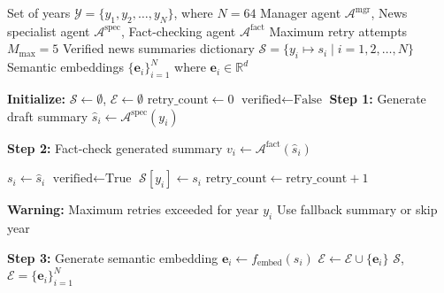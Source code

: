 \documentclass[12pt]{elsarticle}
\begin{document}
\begin{algorithm}[H]
\caption{Agentic generative AI news extraction framework}
\label{alg:agentic_news_extraction}
\begin{algorithmic}
\REQUIRE Set of years $\mathcal{Y} = \{y_1, y_2, \ldots, y_N\}$, where $N = 64$
\REQUIRE Manager agent $\mathcal{A}^{\text{mgr}}$, News specialist agent $\mathcal{A}^{\text{spec}}$, Fact-checking agent $\mathcal{A}^{\text{fact}}$
\REQUIRE Maximum retry attempts $M_{\text{max}} = 5$
\ENSURE Verified news summaries dictionary $\mathcal{S} = \{y_i \mapsto s_i \mid i = 1, 2, \ldots, N\}$
\ENSURE Semantic embeddings $\{\mathbf{e}_i\}_{i=1}^N$ where $\mathbf{e}_i \in \mathbb{R}^d$

\STATE \textbf{Initialize:} $\mathcal{S} \leftarrow \emptyset$, $\mathcal{E} \leftarrow \emptyset$
    \STATE $\text{retry\_count} \leftarrow 0$
    \STATE $\text{verified} \leftarrow \text{False}$
        \STATE \textbf{Step 1:} Generate draft summary
        \STATE $\hat{s}_i \leftarrow \mathcal{A}^{\text{spec}}(y_i)$ 
        
        \STATE \textbf{Step 2:} Fact-check generated summary
        \STATE $v_i \leftarrow \mathcal{A}^{\text{fact}}(\hat{s}_i)$ 
        
            \STATE $s_i \leftarrow \hat{s}_i$ 
            \STATE $\text{verified} \leftarrow \text{True}$
            \STATE $\mathcal{S}[y_i] \leftarrow s_i$ 
        \ELSE
            \STATE $\text{retry\_count} \leftarrow \text{retry\_count} + 1$
        \ENDIF
    \ENDWHILE
    
        \STATE \textbf{Warning:} Maximum retries exceeded for year $y_i$
        \STATE Use fallback summary or skip year
    \ENDIF
    
    \STATE \textbf{Step 3:} Generate semantic embedding
        \STATE $\mathbf{e}_i \leftarrow f_{\text{embed}}(s_i)$ 
        \STATE $\mathcal{E} \leftarrow \mathcal{E} \cup \{\mathbf{e}_i\}$
    \ENDIF
\ENDFOR
\RETURN $\mathcal{S}$, $\mathcal{E} = \{\mathbf{e}_i\}_{i=1}^N$
\end{algorithmic}
\end{algorithm}
\end{document}
